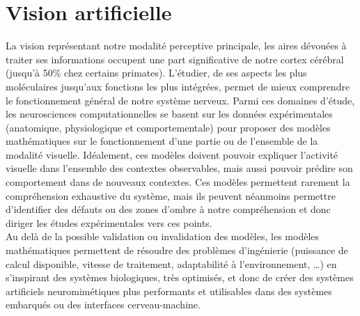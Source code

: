 
\section{Vision artificielle}
La vision représentant notre modalité perceptive principale, les aires dévouées à traiter ses informations occupent une part significative de notre cortex cérébral (jusqu'à 50\% chez certains primates). L'étudier, de ses aspects les plus moléculaires jusqu'aux fonctions les plus intégrées, permet de mieux comprendre le fonctionnement général de notre système nerveux.
Parmi ces domaines d'étude, les neurosciences computationnelles se basent sur les données expérimentales (anatomique, physiologique et comportementale) pour proposer des modèles mathématiques sur le fonctionnement d'une partie ou de l'ensemble de la modalité visuelle. Idéalement, ces modèles doivent pouvoir expliquer l'activité visuelle dans l'ensemble des contextes observables, mais aussi pouvoir prédire son comportement dans de nouveaux contextes.
Ces modèles permettent rarement la compréhension exhaustive du système, mais ils peuvent néanmoins permettre d'identifier des défauts ou des zones d'ombre à notre compréhension et donc diriger les études expérimentales vers ces points. \autocite{Zhaoping2014} \\
Au delà de la possible validation ou invalidation des modèles, les modèles mathématiques permettent de résoudre des problèmes d'ingénierie (puissance de calcul disponible, vitesse de traitement, adaptabilité à l'environnement, \ldots) en s'inspirant des systèmes biologiques, très optimisés, et donc de créer des systèmes artificiels neuromimétiques plus performants et utilisables dans des systèmes embarqués ou des interfaces cerveau-machine. \autocite{Potthast2016} \\


